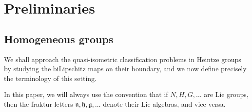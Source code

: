 \documentclass[a4paper,12pt]{amsart}
\newcommand{\e}{\mathrm{e}}
\theoremstyle{plain}
\theoremstyle{definition}
\theoremstyle{plain}
\theoremstyle{remark}
\begin{document}
\section{Preliminaries}

\label{sec:preliminaries}




\subsection{Homogeneous groups}
\label{sec:homog_groups}

We shall approach the quasi-isometric classification problems in Heintze groups by studying the biLipschitz maps on their boundary, and we now define precisely the terminology of this setting.

In this paper, we will always use the convention that if \( N,H,G, \ldots \) are Lie groups, then the fraktur letters \( \mathfrak{n}, \mathfrak{h}, \mathfrak{g}, \ldots \) denote their Lie algebras, and vice versa.


\end{document}

